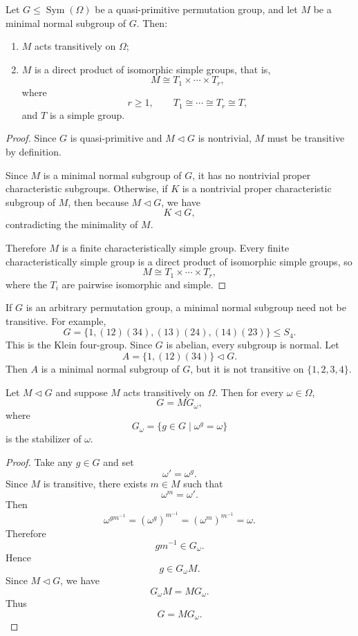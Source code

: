 \begin{proposition}
Let \(G\leq \operatorname{Sym}(\Omega)\) be a quasi-primitive permutation group, and let \(M\) be a minimal normal subgroup of \(G\). Then:

\begin{enumerate}
\item \(M\) acts transitively on \(\Omega\);
\item \(M\) is a direct product of isomorphic simple groups, that is,
\[
M\cong T_1\times \cdots \times T_r,
\]
where
\[
r\geq 1,\qquad T_1\cong \cdots \cong T_r\cong T,
\]
and \(T\) is a simple group.
\end{enumerate}
\end{proposition}

\begin{proof}
Since \(G\) is quasi-primitive and \(M\lhd G\) is nontrivial, \(M\) must be transitive by definition.

Since \(M\) is a minimal normal subgroup of \(G\), it has no nontrivial proper characteristic subgroups. Otherwise, if \(K\) is a nontrivial proper characteristic subgroup of \(M\), then because \(M\lhd G\), we have
\[
K\lhd G,
\]
contradicting the minimality of \(M\).

Therefore \(M\) is a finite characteristically simple group. Every finite characteristically simple group is a direct product of isomorphic simple groups, so
\[
M\cong T_1\times \cdots \times T_r,
\]
where the \(T_i\) are pairwise isomorphic and simple.
\end{proof}

\begin{remark}
If \(G\) is an arbitrary permutation group, a minimal normal subgroup need not be transitive. For example,
\[
G=\{1,(12)(34),(13)(24),(14)(23)\}\leq S_4.
\]
This is the Klein four-group. Since \(G\) is abelian, every subgroup is normal. Let
\[
A=\{1,(12)(34)\}\lhd G.
\]
Then \(A\) is a minimal normal subgroup of \(G\), but it is not transitive on \(\{1,2,3,4\}\).
\end{remark}

\begin{lemma}
Let \(M\lhd G\) and suppose \(M\) acts transitively on \(\Omega\). Then for every \(\omega\in\Omega\),
\[
G=MG_\omega,
\]
where
\[
G_\omega=\{g\in G\mid \omega^g=\omega\}
\]
is the stabilizer of \(\omega\).
\end{lemma}

\begin{proof}
Take any \(g\in G\) and set
\[
\omega'=\omega^g.
\]
Since \(M\) is transitive, there exists \(m\in M\) such that
\[
\omega^m=\omega'.
\]
Then
\[
\omega^{gm^{-1}}
=
(\omega^g)^{m^{-1}}
=
(\omega^m)^{m^{-1}}
=
\omega.
\]
Therefore
\[
gm^{-1}\in G_\omega.
\]
Hence
\[
g\in G_\omega M.
\]
Since \(M\lhd G\), we have
\[
G_\omega M=MG_\omega.
\]
Thus
\[
G=MG_\omega.
\]
\end{proof}

